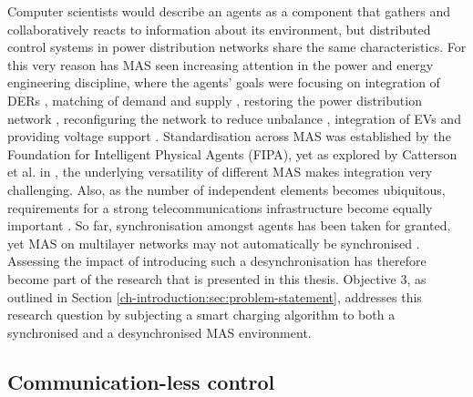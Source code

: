 Computer scientists would describe an agents as a component that gathers and collaboratively reacts to information about its environment, but distributed control systems in power distribution networks share the same characteristics.
For this very reason has MAS seen increasing attention in the power and energy engineering discipline, where the agents' goals were focusing on integration of DERs \cite{Al-Hinai2004, Dimeas2005, Vasirani2013, Dou2017, Gomez-Sanz2014}, matching of demand and supply \cite{Kok2005}, restoring the power distribution network \cite{Li2012}, reconfiguring the network to reduce unbalance \cite{Ding2016}, integration of EVs \cite{Lopez2011, Karfopoulos2013, Ramachandran2013, GrauUnda2014} and providing voltage support \cite{Baran2007}.
Standardisation across MAS was established by the Foundation for Intelligent Physical Agents (FIPA), yet as explored by Catterson et al. in \cite{Catterson2005}, the underlying versatility of different MAS makes integration very challenging.
Also, as the number of independent elements becomes ubiquitous, requirements for a strong telecommunications infrastructure become equally important \cite{Hatziargyriou2015}.
So far, synchronisation amongst agents has been taken for granted, yet MAS on multilayer networks may not automatically be synchronised \cite{He2017}.
Assessing the impact of introducing such a desynchronisation has therefore become part of the research that is presented in this thesis.
Objective 3, as outlined in Section \ref{ch-introduction:sec:problem-statement}, addresses this research question by subjecting a smart charging algorithm to both a synchronised and a desynchronised MAS environment.

\subsection{Communication-less control}
\label{ch-literature:subsec:communication-less-control}

